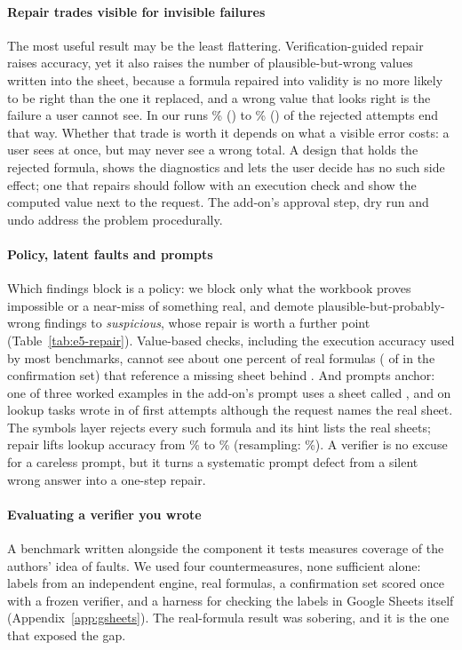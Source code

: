 \paragraph{Repair trades visible for invisible failures}
The most useful result may be the least flattering. Verification-guided repair raises accuracy, yet it also raises the number of plausible-but-wrong values written into the sheet, because a formula repaired into validity is no more likely to be right than the one it replaced, and a wrong value that looks right is the failure a user cannot see. In our runs \hmAUnsafeVtwoRate\% (\efAName) to \hmBUnsafeVtwoRate\% (\efBName) of the rejected attempts end that way. Whether that trade is worth it depends on what a visible error costs: a user sees  at once, but may never see a wrong total. A design that holds the rejected formula, shows the diagnostics and lets the user decide has no such side effect; one that repairs should follow with an execution check and show the computed value next to the request. The add-on's approval step, dry run and undo address the problem procedurally.

\paragraph{Policy, latent faults and prompts}
Which findings block is a policy: we block only what the workbook proves impossible or a near-miss of something real, and demote plausible-but-probably-wrong findings to \emph{suspicious}, whose repair is worth a further point (Table~\ref{tab:e5-repair}). Value-based checks, including the execution accuracy used by most benchmarks, cannot see about one percent of real formulas (\rwcFGhostOkMasked{} of \rwcFFormulas{} in the confirmation set) that reference a missing sheet behind . And prompts anchor: one of three worked examples in the add-on's prompt uses a sheet called , and on lookup tasks \efAName{} wrote  in \efALkSheetTwo{} of \efALkN{} first attempts although the request names the real sheet. The symbols layer rejects every such formula and its hint lists the real sheets; repair lifts lookup accuracy from \efALkBase\% to \efALkvtwofb\% (resampling: \efALkresample\%). A verifier is no excuse for a careless prompt, but it turns a systematic prompt defect from a silent wrong answer into a one-step repair.

\paragraph{Evaluating a verifier you wrote}
A benchmark written alongside the component it tests measures coverage of the authors' idea of faults. We used four countermeasures, none sufficient alone: labels from an independent engine, real formulas, a confirmation set scored once with a frozen verifier, and a harness for checking the labels in Google Sheets itself (Appendix~\ref{app:gsheets}). The real-formula result was sobering, and it is the one that exposed the gap.
